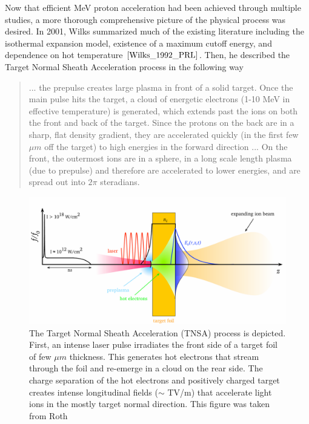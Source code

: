 Now that efficient MeV proton acceleration had been achieved through multiple studies, a more thorough comprehensive picture of the physical process was desired. In 2001, Wilks\cite{Wilks_2001_PoP} summarized much of the existing literature including the isothermal expansion model\cite{Crow_1975_JPP}, existence of a maximum cutoff energy\cite{Kishimoto_1983_PoF}, and dependence on hot temperature $\cite{Wilks_1992_PRL}$. Then, he described the Target Normal Sheath Acceleration process in the following way\cite{Wilks_2001_PoP}

\begin{quote}
	... the prepulse creates large plasma in front of a solid target. Once the main pulse hits the target, a cloud of energetic electrons (1-10 MeV in effective temperature) is generated, which extends past the ions on both the front and back of the target. Since the protons on the back are in a sharp, flat density gradient, they are accelerated quickly (in the first few $\mu m$ off the target) to high energies in the forward direction ... On the front, the outermost ions are in a sphere, in a long scale length plasma (due to prepulse) and therefore are accelerated to lower energies, and are spread out into $2 \pi$ steradians.
\end{quote}

\begin{figure}
	\centering 
	\includegraphics[width=\linewidth]{planning/images/tnsa.PNG}
	\caption{The Target Normal Sheath Acceleration (TNSA) process is depicted. First, an intense laser pulse irradiates the front side of a target foil of few $\mu m$ thickness. This generates hot electrons that stream through the foil and re-emerge in a cloud on the rear side. The charge separation of the hot electrons and positively charged target creates intense longitudinal fields ($\sim$ TV/m) that accelerate light ions in the mostly target normal direction. This figure was taken from Roth\cite{Roth_2016_CERN_TNSA}}
	\label{fig:tnsa}
\end{figure}

